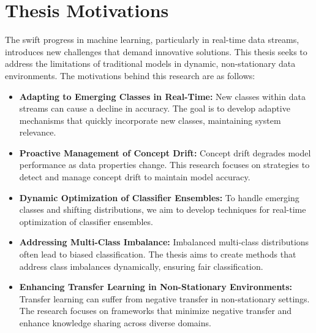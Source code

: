 
\section{Thesis Motivations}
\label{sec:1_introduction_motivation}

The swift progress in machine learning, particularly in real-time data streams, introduces new challenges that demand innovative solutions. This thesis seeks to address the limitations of traditional models in dynamic, non-stationary data environments. The motivations behind this research are as follows:
\begin{itemize}
    \setlength{\itemsep}{0pt}
    \setlength{\parskip}{0pt}
    \item \textbf{Adapting to Emerging Classes in Real-Time:} New classes within data streams can cause a decline in accuracy. The goal is to develop adaptive mechanisms that quickly incorporate new classes, maintaining system relevance.
    \item \textbf{Proactive Management of Concept Drift:} Concept drift degrades model performance as data properties change. This research focuses on strategies to detect and manage concept drift to maintain model accuracy.
    \item \textbf{Dynamic Optimization of Classifier Ensembles:} To handle emerging classes and shifting distributions, we aim to develop techniques for real-time optimization of classifier ensembles.
    \item \textbf{Addressing Multi-Class Imbalance:} Imbalanced multi-class distributions often lead to biased classification. The thesis aims to create methods that address class imbalances dynamically, ensuring fair classification.
    \item \textbf{Enhancing Transfer Learning in Non-Stationary Environments:} Transfer learning can suffer from negative transfer in non-stationary settings. The research focuses on frameworks that minimize negative transfer and enhance knowledge sharing across diverse domains.
\end{itemize}
